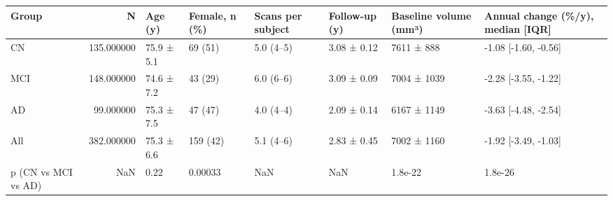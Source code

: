 \begin{tabular}{lrllllll}
\toprule
Group & N & Age (y) & Female, n (\%) & Scans per subject & Follow-up (y) & Baseline volume (mm³) & Annual change (\%/y), median [IQR] \\
\midrule
CN & 135.000000 & 75.9 ± 5.1 & 69 (51) & 5.0 (4–5) & 3.08 ± 0.12 & 7611 ± 888 & -1.08 [-1.60, -0.56] \\
MCI & 148.000000 & 74.6 ± 7.2 & 43 (29) & 6.0 (6–6) & 3.09 ± 0.09 & 7004 ± 1039 & -2.28 [-3.55, -1.22] \\
AD & 99.000000 & 75.3 ± 7.5 & 47 (47) & 4.0 (4–4) & 2.09 ± 0.14 & 6167 ± 1149 & -3.63 [-4.48, -2.54] \\
All & 382.000000 & 75.3 ± 6.6 & 159 (42) & 5.1 (4–6) & 2.83 ± 0.45 & 7002 ± 1160 & -1.92 [-3.49, -1.03] \\
p (CN vs MCI vs AD) & NaN & 0.22 & 0.00033 & NaN & NaN & 1.8e-22 & 1.8e-26 \\
\bottomrule
\end{tabular}

